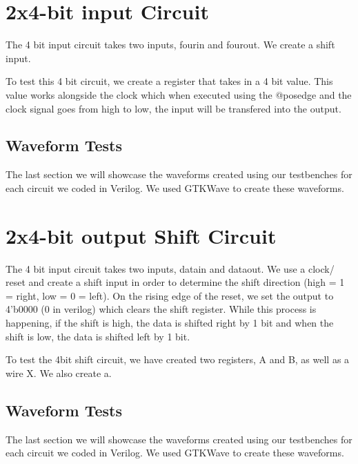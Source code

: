 \documentclass[12pt]{article}
\begin{document}
\section{2x4-bit input Circuit}
The 4 bit input circuit takes two inputs, fourin and fourout. We create a shift input. 

To test this 4 bit circuit, we create a register that takes in a 4 bit value. This value works alongside the clock which when executed using the @posedge and the clock signal goes from high to low, the input will be transfered into the output.





\subsection{Waveform Tests}

The last section we will showcase the waveforms created using our testbenches for each circuit we coded in Verilog. We used GTKWave to create these waveforms.






\section{2x4-bit output Shift Circuit}
The 4 bit input circuit takes two inputs, datain and dataout. We use a clock/ reset and create a shift input in order to determine the shift direction (high = 1 = right, low = 0 = left).  On the rising edge of the reset, we set the output to 4'b0000 (0 in verilog) which clears the shift register. While this process is happening, if the shift is high, the data is shifted right by 1 bit and when the shift is low, the data is shifted left by 1 bit.



To test the 4bit shift circuit, we have created two registers, A and B, as well as a wire X. We also create a.




\subsection{Waveform Tests}

The last section we will showcase the waveforms created using our testbenches for each circuit we coded in Verilog. We used GTKWave to create these waveforms.
\end{document}
